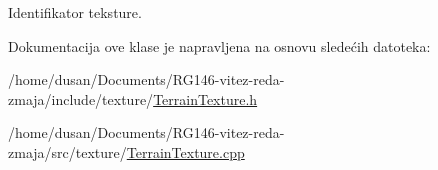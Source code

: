 Identifikator teksture. 



Dokumentacija ove klase je napravljena na osnovu sledećih datoteka\+:\begin{DoxyCompactItemize}
\item 
/home/dusan/\+Documents/\+R\+G146-\/vitez-\/reda-\/zmaja/include/texture/\hyperlink{TerrainTexture_8h}{Terrain\+Texture.\+h}\item 
/home/dusan/\+Documents/\+R\+G146-\/vitez-\/reda-\/zmaja/src/texture/\hyperlink{TerrainTexture_8cpp}{Terrain\+Texture.\+cpp}\end{DoxyCompactItemize}
